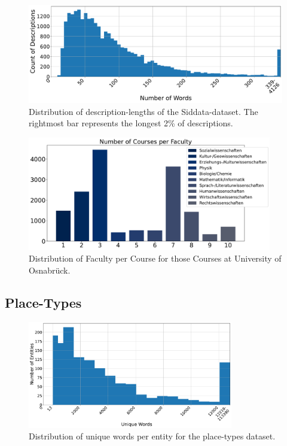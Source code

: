 \begin{figure}[H]
	\centering
	\includegraphics[width=\textwidth]{graphics/dataset_new/words_per_desc.pdf}
	\caption{Distribution of description-lengths of the Siddata-dataset. The rightmost bar represents the longest 2\% of descriptions.}
	\label{fig:sid_wordsperdesc}
\end{figure}

\begin{figure}[H]
	\centering
	\includegraphics[width=0.95\textwidth]{graphics/dataset_new/courses_per_faculty.pdf}
	\caption{Distribution of Faculty per Course for those Courses at University of Osnabrück.}
	\label{fig:courses_per_faculty}
\end{figure}





\subsection{Place-Types}
\label{sec:dataset_placetypes}


\begin{figure}[H]
	\centering
	\includegraphics[width=0.8\textwidth]{graphics/figures/placetypes_dist_unique.pdf}
	\caption{Distribution of unique words per entity for the place-types dataset.}
	\label{fig:placetypes_dist_unique}
\end{figure}




